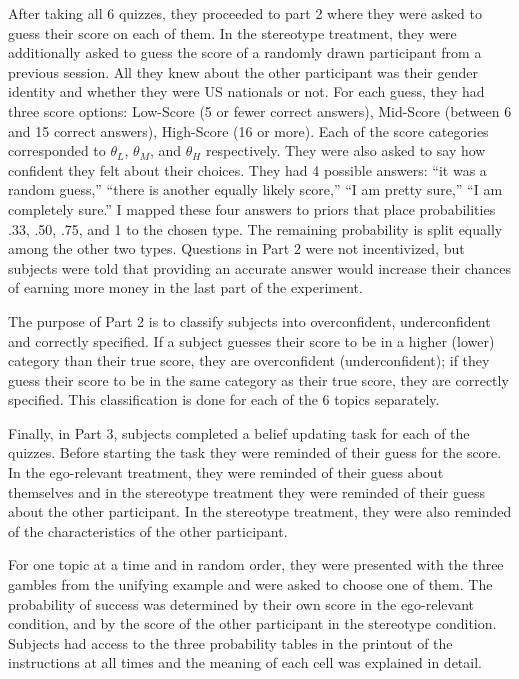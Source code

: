 \documentclass[
  12pt,
]{article}
\begin{document}
After taking all 6 quizzes, they proceeded to part 2 where they were
asked to guess their score on each of them. In the stereotype treatment,
they were additionally asked to guess the score of a randomly drawn
participant from a previous session. All they knew about the other
participant was their gender identity and whether they were US nationals
or not. For each guess, they had three score options: Low-Score (5 or
fewer correct answers), Mid-Score (between 6 and 15 correct answers),
High-Score (16 or more). Each of the score categories corresponded to
\(\theta_L\), \(\theta_M\), and \(\theta_H\) respectively. They were
also asked to say how confident they felt about their choices. They had
4 possible answers: ``it was a random guess,'' ``there is another
equally likely score,'' ``I am pretty sure,'' ``I am completely sure.''
I mapped these four answers to priors that place probabilities .33, .50,
.75, and 1 to the chosen type. The remaining probability is split
equally among the other two types. Questions in Part 2 were not
incentivized, but subjects were told that providing an accurate answer
would increase their chances of earning more money in the last part of
the experiment.

The purpose of Part 2 is to classify subjects into overconfident,
underconfident and correctly specified. If a subject guesses their score
to be in a higher (lower) category than their true score, they are
overconfident (underconfident); if they guess their score to be in the
same category as their true score, they are correctly specified. This
classification is done for each of the 6 topics separately.

Finally, in Part 3, subjects completed a belief updating task for each
of the quizzes. Before starting the task they were reminded of their
guess for the score. In the ego-relevant treatment, they were reminded
of their guess about themselves and in the stereotype treatment they
were reminded of their guess about the other participant. In the
stereotype treatment, they were also reminded of the characteristics of
the other participant.

For one topic at a time and in random order, they were presented with
the three gambles from the unifying example and were asked to choose one
of them. The probability of success was determined by their own score in
the ego-relevant condition, and by the score of the other participant in
the stereotype condition. Subjects had access to the three probability
tables in the printout of the instructions at all times and the meaning
of each cell was explained in detail.
\end{document}
